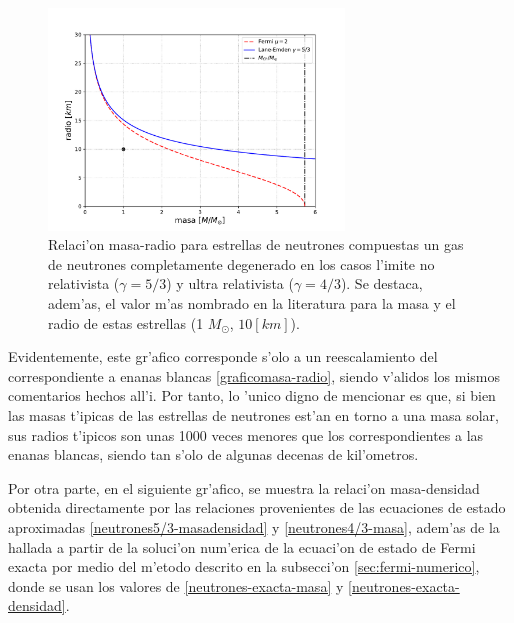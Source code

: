 \begin{figure}[H]
\centering
\includegraphics[angle=0,width=0.7\textwidth]{fig/fig-fermineutron-masa-radio.pdf}
\caption{Relaci'on masa-radio para estrellas de neutrones compuestas un gas de neutrones completamente degenerado en los casos l'imite no relativista ($\gamma=5/3$) y ultra relativista ($\gamma=4/3$). Se destaca, adem'as, el valor m'as nombrado en la literatura para la masa y el radio de estas estrellas (1 $M_\odot$, $10[km]$).}\label{graficomasa-radio-neutrones}
\end{figure}

Evidentemente, este gr'afico corresponde s'olo a un reescalamiento del correspondiente a enanas blancas \ref{graficomasa-radio}, siendo v'alidos los mismos comentarios hechos all'i. Por tanto, lo 'unico digno de mencionar es que, si bien las masas t'ipicas de las estrellas de neutrones est'an en torno a una masa solar, sus radios t'ipicos son unas 1000 veces menores que los correspondientes a las enanas blancas, siendo tan s'olo de algunas decenas de kil'ometros.

Por otra parte, en el siguiente gr'afico, se muestra la relaci'on masa-densidad obtenida directamente por las relaciones provenientes de las ecuaciones de estado aproximadas \eqref{neutrones5/3-masadensidad} y \eqref{neutrones4/3-masa}, adem'as de la hallada a partir de la soluci'on num'erica de la ecuaci'on de estado de Fermi exacta por medio del m'etodo descrito en la subsecci'on \ref{sec:fermi-numerico}, donde se usan los valores de \eqref{neutrones-exacta-masa} y \eqref{neutrones-exacta-densidad}.

